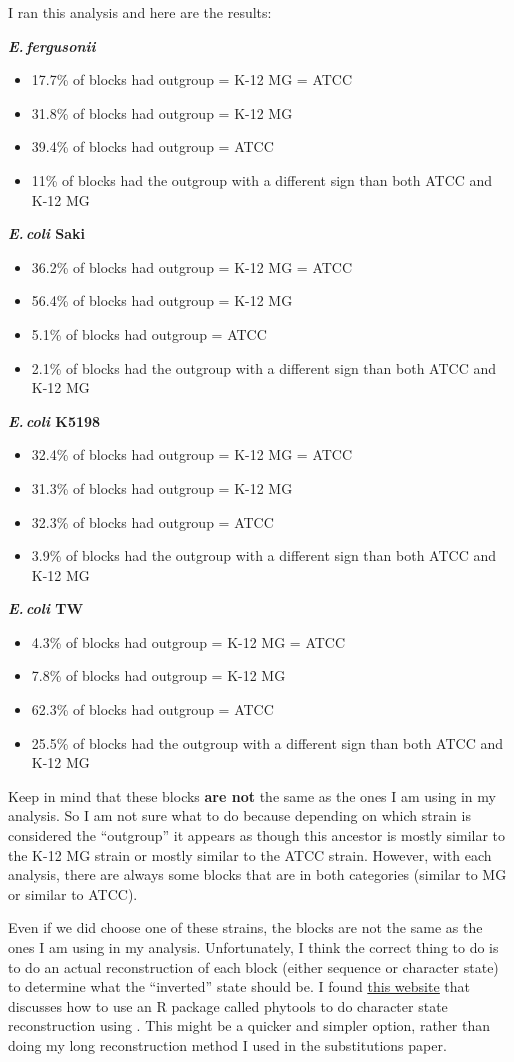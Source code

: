 \documentclass[12pt]{article}
\newcommand{\efer}{\textit{E.\,fergusonii}\xspace}
\newcommand{\ecol}{\textit{E.\,coli}\xspace}
\newcommand{\uhref}[2]{\href{#1}{\underline{#2}}}
\begin{document}
I ran this analysis and here are the results:

\textbf{\efer}
\begin{itemize}
	\item 17.7\% of blocks had outgroup = K-12 MG = ATCC
	\item 31.8\% of blocks had outgroup = K-12 MG
	\item 39.4\% of blocks had outgroup = ATCC
	\item 11\% of blocks had the outgroup with a different sign than both ATCC and K-12 MG
\end{itemize}

\textbf{\ecol Saki}
\begin{itemize}
	\item 36.2\% of blocks had outgroup = K-12 MG = ATCC
	\item 56.4\% of blocks had outgroup = K-12 MG
	\item 5.1\% of blocks had outgroup = ATCC
	\item 2.1\% of blocks had the outgroup with a different sign than both ATCC and K-12 MG
\end{itemize}

\textbf{\ecol K5198}
\begin{itemize}
	\item 32.4\% of blocks had outgroup = K-12 MG = ATCC
	\item 31.3\% of blocks had outgroup = K-12 MG
	\item 32.3\% of blocks had outgroup = ATCC
	\item 3.9\% of blocks had the outgroup with a different sign than both ATCC and K-12 MG
\end{itemize}

\textbf{\ecol TW}
\begin{itemize}
	\item 4.3\% of blocks had outgroup = K-12 MG = ATCC
	\item 7.8\% of blocks had outgroup = K-12 MG
	\item 62.3\% of blocks had outgroup = ATCC
	\item 25.5\% of blocks had the outgroup with a different sign than both ATCC and K-12 MG
\end{itemize}

Keep in mind that these blocks \textbf{are not} the same as the ones I am using in my analysis.
So I am not sure what to do because depending on which strain is considered the ``outgroup'' it appears as though this ancestor is mostly similar to the K-12 MG strain or mostly similar to the ATCC strain.
However, with each analysis, there are always some blocks that are in both categories (similar to MG or similar to ATCC).

Even if we did choose one of these strains, the blocks are not the same as the ones I am using in my analysis. 
Unfortunately, I think the correct thing to do is to do an actual reconstruction of each block (either sequence or character state) to determine what the ``inverted'' state should be.
I found \uhref{http://www.phytools.org/eqg/Exercise_5.2/}{this website} that discusses how to use an R package called phytools to do character state reconstruction using .
This might be a quicker and simpler option, rather than doing my long reconstruction method I used in the substitutions paper.
\end{document}

